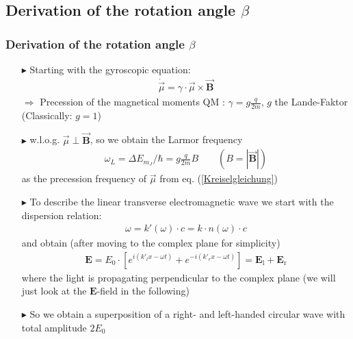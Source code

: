 \documentclass[11pt,a4paper]{beamer}
\begin{document}
\begin{frame}
\subsection{Derivation of the rotation angle $\beta$}
\frametitle{Derivation of the rotation angle $\beta$}
\begin{itemize}
\item[$\blacktriangleright$]
Starting with the gyroscopic equation:
\begin{align}
\dot{\vec{\mu}} = \gamma\cdot\vec{\mu}\times\vec{\textbf{B}}
\label{Kreiselgleichung}
\end{align}
$\Rightarrow$ Precession of the magnetical moments
\newline \newline
QM : $\gamma = g\frac{q}{2m}$, $g$ the Lande-Faktor
(Classically: $g=1$)\newline \newline
\item[$\blacktriangleright$]
w.l.o.g. $\vec{\mu} \perp \vec{\textbf{B}}$, so we obtain the Larmor frequency
\begin{align}
\omega_L = \Delta E_{m_J}/ \hbar = g\frac{q}{2m}B \qquad (B = |\vec{\textbf{B}}|)
\label{Larmorfrequenz}
\end{align}
as the precession frequency of $\vec{\mu}$ from eq. (\ref{Kreiselgleichung})
\end{itemize}
\end{frame}
\begin{frame}
\begin{itemize}
\item[$\blacktriangleright$]
To describe the linear transverse electromagnetic wave we start with the dispersion relation:
\begin{align}
\omega = k'(\omega)\cdot c = k\cdot n(\omega)\cdot c
\label{Dispersionsrelation}
\end{align}
and obtain (after moving to the complex plane for simplicity)
 \begin{align}
\textbf{E} = E_0\cdot[e^{i( k'_l x - \omega t)}+e^{-i( k'_r x - \omega t )}] = \textbf{E}_{\text{l}} + \textbf{E}_{\text{r}}
\label{Lichtwelle_1}
 \end{align} 
where the light is propagating perpendicular to the complex plane (we will just look at the $\textbf{E}$-field in the following)\newline
\item[$\blacktriangleright$] So we obtain a superposition of a right- and left-handed circular wave with total amplitude $2E_0$
\end{itemize}
\end{frame}
\end{document}

